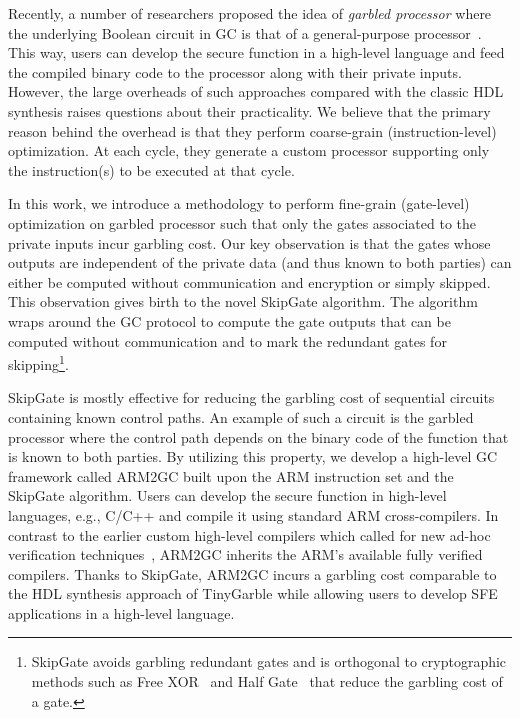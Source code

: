 Recently, a number of researchers proposed the idea of \textit{garbled processor} where the underlying Boolean circuit in GC is that of a general-purpose processor~\cite{wang2015secure, songhori2016garbledcpu}.
This way, users can develop the secure function in a high-level language and feed the compiled binary code to the processor along with their private inputs.
However, the large overheads of such approaches compared with the classic HDL synthesis raises questions about their practicality.
We believe that the primary reason behind the overhead is that they perform coarse-grain (instruction-level) optimization.
At each cycle, they generate a custom processor supporting only the instruction(s) to be executed at that cycle.

In this work, we introduce a methodology to perform fine-grain (gate-level) optimization on garbled processor such that only the gates associated to the private inputs incur garbling cost.
Our key observation is that the gates whose outputs are independent of the private data (and thus known to both parties) can either be computed without communication and encryption or simply skipped.
This observation gives birth to the novel SkipGate algorithm.
The algorithm wraps around the GC protocol to compute the gate outputs that can be computed without communication and to mark the redundant gates for skipping\footnote{SkipGate avoids garbling redundant gates and is orthogonal to cryptographic methods such as Free XOR~\cite{kolesnikov2008improved} and Half Gate~\cite{zahur2015two} that reduce the garbling cost of a gate.}.

SkipGate is mostly effective for reducing the garbling cost of sequential circuits~\cite{songhori2015tinygarble} containing known control paths.
An example of such a circuit is the garbled processor where the control path depends on the binary code of the function that is known to both parties.
By utilizing this property, we develop a high-level GC framework called ARM2GC built upon the ARM instruction set and the SkipGate algorithm.
Users can develop the secure function in high-level languages, e.g., C/C++ and compile it using standard ARM cross-compilers.
In contrast to the earlier custom high-level compilers which called for new ad-hoc verification techniques~\cite{rastogi2014wysteria,demmler2015aby,liu2015oblivm,mood2016frigate}, ARM2GC inherits the ARM's available fully verified compilers.
Thanks to SkipGate, ARM2GC incurs a garbling cost comparable to the HDL synthesis approach of TinyGarble while allowing users to develop SFE applications in a high-level language.

